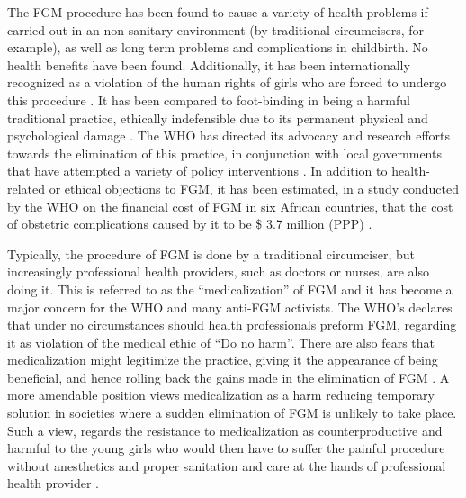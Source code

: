 \documentclass[12pt]{article}
\begin{document}
The FGM procedure has been found to cause a variety of health problems if carried out in an non-sanitary environment (by traditional circumcisers, for example), as well as long term problems and complications in childbirth.  No health benefits have been found. Additionally, it has been internationally recognized as a violation of the human rights of girls who are forced to undergo this procedure \citep{whofs241}. It has been compared to foot-binding in being a harmful traditional practice, ethically indefensible due to its permanent physical and psychological damage \citep{Mackie1996}. The WHO has directed its advocacy and research efforts towards the elimination of this practice, in conjunction with local governments that have attempted a variety of policy interventions \citep{whofs241}. In addition to health-related or ethical objections to FGM, it has been estimated, in a study conducted by the WHO on the financial cost of FGM in six African countries, that the cost of obstetric complications caused by it to be \$ 3.7 million (PPP) \citep{Bishai2010}.

Typically, the procedure of FGM  is done by a traditional circumciser, but increasingly professional health providers, such as doctors or nurses, are also doing it.  This is referred to as the ``medicalization'' of FGM and it has become a major concern for the WHO and many anti-FGM activists. The WHO's declares that under no circumstances should health professionals preform FGM, regarding it as violation of the medical ethic of ``Do no harm''. There are also fears that medicalization might legitimize the practice, giving it the appearance of being beneficial, and hence rolling back the gains made in the elimination of FGM \citep{OHCHR}. A more amendable position views medicalization as a harm reducing temporary solution in societies where a sudden elimination of FGM is unlikely to take place.  Such a view, regards the resistance to medicalization as counterproductive and harmful to the young girls who would then have to suffer the painful procedure without anesthetics and proper sanitation and care at the hands of professional health provider \citep{Shell-Duncan2001}. 
\end{document}
